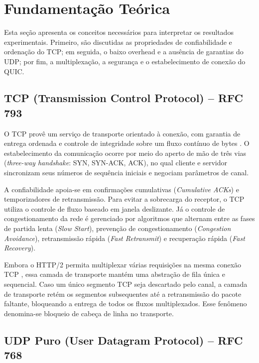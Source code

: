\documentclass[12pt]{article}
\begin{document}
\section{Fundamentação Teórica}

Esta seção apresenta os conceitos necessários para interpretar os resultados experimentais. Primeiro, são discutidas as propriedades de confiabilidade e ordenação do TCP; em seguida, o baixo overhead e a ausência de garantias do UDP; por fim, a multiplexação, a segurança e o estabelecimento de conexão do QUIC.

\subsection{TCP (Transmission Control Protocol) -- RFC 793}

O TCP provê um serviço de transporte orientado à conexão, com garantia de entrega ordenada e controle de integridade sobre um fluxo contínuo de bytes \cite{rfc793}. O estabelecimento da comunicação ocorre por meio do aperto de mão de três vias (\emph{three-way handshake}: SYN, SYN-ACK, ACK), no qual cliente e servidor sincronizam seus números de sequência iniciais e negociam parâmetros de canal.

A confiabilidade apoia-se em confirmações cumulativas (\emph{Cumulative ACKs}) e temporizadores de retransmissão. Para evitar a sobrecarga do receptor, o TCP utiliza o controle de fluxo baseado em janela deslizante. Já o controle de congestionamento da rede é gerenciado por algoritmos que alternam entre as fases de partida lenta (\emph{Slow Start}), prevenção de congestionamento (\emph{Congestion Avoidance}), retransmissão rápida (\emph{Fast Retransmit}) e recuperação rápida (\emph{Fast Recovery}).

Embora o HTTP/2 permita multiplexar várias requisições na mesma conexão TCP \cite{rfc9113}, essa camada de transporte mantém uma abstração de fila única e sequencial. Caso um único segmento TCP seja descartado pelo canal, a camada de transporte retém os segmentos subsequentes até a retransmissão do pacote faltante, bloqueando a entrega de todos os fluxos multiplexados. Esse fenômeno denomina-se bloqueio de cabeça de linha no transporte.

\subsection{UDP Puro (User Datagram Protocol) -- RFC 768}
\end{document}

